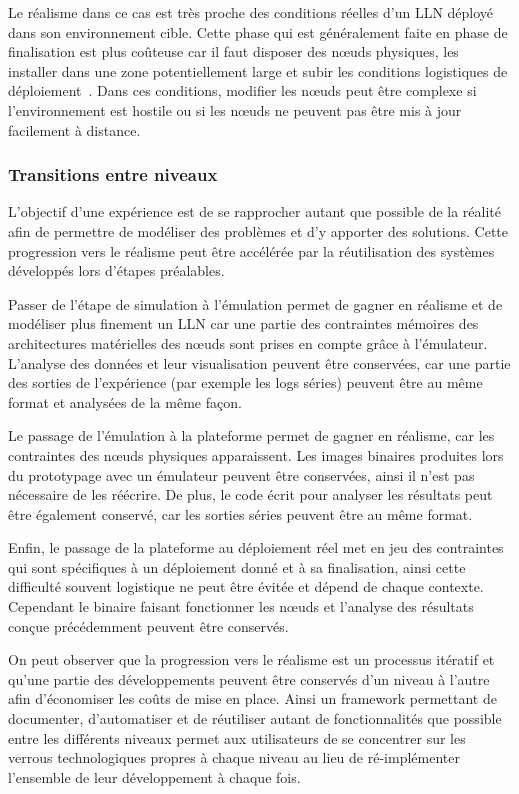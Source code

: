 Le réalisme dans ce cas est très proche des conditions réelles d'un \ac{LLN} déployé dans son environnement cible.
Cette phase qui est généralement faite en phase de finalisation est plus coûteuse car il faut disposer des nœuds physiques, les installer dans une zone potentiellement large et subir les conditions logistiques de déploiement~\cite{werner2006deploying}.
Dans ces conditions, modifier les nœuds peut être complexe si l'environnement est hostile ou si les nœuds ne peuvent pas être mis à jour facilement à distance.

\subsubsection{Transitions entre niveaux}
\label{makesense:transition}

L'objectif d'une expérience est de se rapprocher autant que possible de la réalité afin de permettre de modéliser des problèmes et d'y apporter des solutions.
Cette progression vers le réalisme peut être accélérée par la réutilisation des systèmes développés lors d'étapes préalables.

Passer de l'étape de simulation à l'émulation permet de gagner en réalisme et de modéliser plus finement un \ac{LLN} car une partie des contraintes mémoires des architectures matérielles des nœuds sont prises en compte grâce à l'émulateur.
L'analyse des données et leur visualisation peuvent être conservées, car une partie des sorties de l'expérience (par exemple les logs séries) peuvent être au même format et analysées de la même façon.

Le passage de l'émulation à la plateforme permet de gagner en réalisme, car les contraintes des nœuds physiques apparaissent.
Les images binaires produites lors du prototypage avec un émulateur peuvent être conservées, ainsi il n'est pas nécessaire de les réécrire.
De plus, le code écrit pour analyser les résultats peut être également conservé, car les sorties séries peuvent être au même format.

Enfin, le passage de la plateforme au déploiement réel met en jeu des contraintes qui sont spécifiques à un déploiement donné et à sa finalisation, ainsi cette difficulté souvent logistique ne peut être évitée et dépend de chaque contexte.
Cependant le binaire faisant fonctionner les nœuds et l'analyse des résultats conçue précédemment peuvent être conservés.

On peut observer que la progression vers le réalisme est un processus itératif et qu'une partie des développements peuvent être conservés d'un niveau à l'autre afin d'économiser les coûts de mise en place.
Ainsi un framework permettant de documenter, d'automatiser et de réutiliser autant de fonctionnalités que possible entre les différents niveaux permet aux utilisateurs de se concentrer sur les verrous technologiques propres à chaque niveau au lieu de ré-implémenter l'ensemble de leur développement à chaque fois. 

